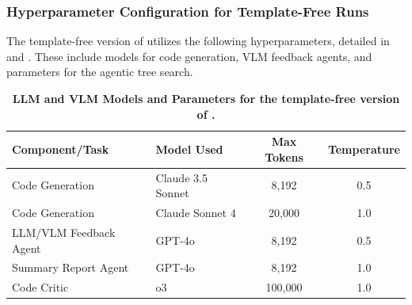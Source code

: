 \begin{appendices}
\subsubsection{Hyperparameter Configuration for Template-Free Runs}
\label{app:v2_hyperparams}
The template-free version of \ouralgo utilizes the following hyperparameters, detailed in  and .
These include models for code generation, VLM feedback agents, and parameters for the agentic tree search.

\begin{table}[h!]
\centering
\caption{\textbf{LLM and VLM Models and Parameters for the template-free version of \ouralgo.}}
\label{tab:v2_hyperparameters_models}
\begin{tabular}{@{}llcc@{}}
\toprule
\textbf{Component/Task} & \textbf{Model Used} & \textbf{Max Tokens} & \textbf{Temperature} \\
\midrule
Code Generation & Claude 3.5 Sonnet & 8,192 & 0.5 \\
Code Generation & Claude Sonnet 4 & 20,000 & 1.0 \\
LLM/VLM Feedback Agent & GPT-4o & 8,192 & 0.5 \\
Summary Report Agent & GPT-4o & 8,192 & 1.0 \\
Code Critic & o3 & 100,000 & 1.0 \\
\bottomrule
\end{tabular}
\end{table}

\begin{table}[h!]
\centering
{}
\end{table}


\end{appendices}
